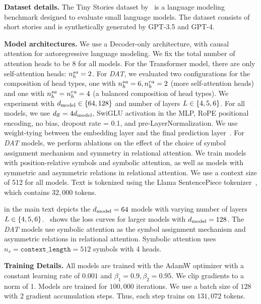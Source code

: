 
\textbf{Dataset details.} The Tiny Stories dataset by~\citet{eldanTinyStoriesHowSmall2023} is a language modeling benchmark designed to evaluate small language models. The dataset consists of short stories and is synthetically generated by GPT-3.5 and GPT-4.

\textbf{Model architectures.} We use a Decoder-only architecture, with causal attention for autoregressive language modeling. We fix the total number of attention heads to be $8$ for all models. For the Transformer model, there are only self-attention heads: $n_h^{sa} = 2$. For \textit{DAT}, we evaluated two configurations for the composition of head types, one with $n_h^{sa} = 6, n_h^{ra} = 2$ (more self-attention heads) and one with $n_h^{sa} = n_h^{ra} = 4$ (a balanced composition of head types). We experiment with $d_{\mathrm{model}} \in \{64, 128\}$ and number of layers $L \in \{4, 5, 6\}$. For all models, we use $d_{\mathrm{ff}} = 4 d_{\mathrm{model}}$, SwiGLU activation in the MLP, RoPE positional encoding, no bias, dropout rate = 0.1, and pre-LayerNormalization. We use weight-tying between the embedding layer and the final prediction layer~\citep{inanTyingWordVectors2016}. For \textit{DAT} models, we perform ablations on the effect of the choice of symbol assignment mechanism and symmetry in relational attention. We train models with position-relative symbols and symbolic attention, as well as models with symmetric and asymmetric relations in relational attention. We use a context size of 512 for all models. Text is tokenized using the Llama SentencePiece tokenizer~\citep{touvronLlamaOpenFoundation2023}, which contains $32,000$ tokens.

 in the main text depicts the $d_{\mathrm{model}} = 64$ models with varying number of layers $L \in \{4, 5, 6\}$.~ shows the loss curves for larger models with $d_{\mathrm{model}} = 128$. The \textit{DAT} models use symbolic attention as the symbol assignment mechanism and asymmetric relations in relational attention. Symbolic attention uses $n_s = \texttt{context\_length} = 512$ symbols with 4 heads.

\textbf{Training Details.} All models are trained with the AdamW optimizer with a constant learning rate of $0.001$ and $\beta_1 = 0.9, \beta_2 = 0.95$. We clip gradients to a norm of 1. Models are trained for $100,000$ iterations. We use a batch size of $128$ with $2$ gradient accumulation steps. Thus, each step trains on $131,072$ tokens.

